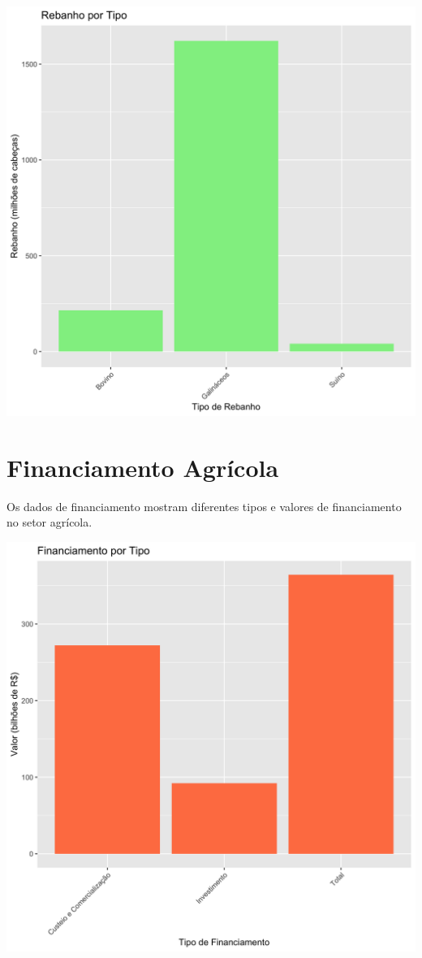 \documentclass{article}
\begin{document}
\includegraphics[width=\textwidth]{build/rebanho_por_tipo.png}

\section{Financiamento Agrícola}
Os dados de financiamento mostram diferentes tipos e valores de financiamento no setor agrícola.

\includegraphics[width=\textwidth]{build/financiamento_por_tipo.png}
\end{document}
